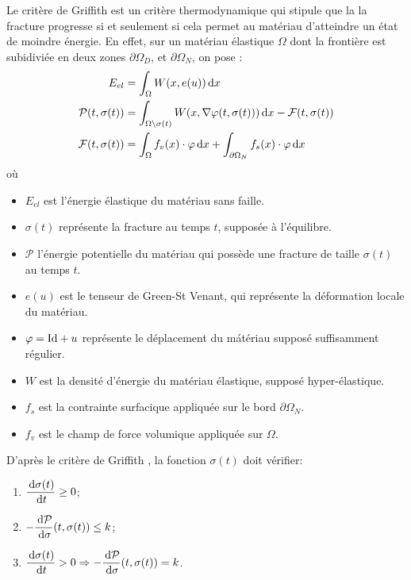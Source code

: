 Le critère de Griffith est un critère thermodynamique qui stipule que la la fracture progresse si et seulement si cela permet au matériau d’atteindre un état de moindre énergie. En effet, sur un matériau élastique $\Omega$ dont la frontière est subidiviée en deux zones $\partial \Omega_D$, et $\partial \Omega_N$, on pose \parencite[p.31]{balasoiu2020thesis} :
\begin{align*}
    E_{el} &= \int_{\Omega} W (x, e(u)) \diff x     \\
    \mathcal{P}(t,\sigma(t)) &= \int_{\Omega \backslash \sigma(t) } W (x, \nabla\varphi (t, \sigma(t))) \diff x - \mathcal{F}(t,\sigma(t)) \\
    \mathcal{F}(t,\sigma(t)) &= \int_{\Omega} f_v (x)\cdot \varphi \diff x + \int_{\partial\Omega_N} f_s (x) \cdot \varphi \diff x
\end{align*}
où 
\begin{itemize}
    \item $E_{el}$ est l'énergie élastique du matériau sans faille.
    \item $\sigma(t)$ représente la fracture au temps $t$, supposée à l'équilibre.
    \item $\mathcal{P}$ l’énergie potentielle du matériau qui possède une fracture de taille $\sigma(t)$ au temps $t$.
    \item $e(u)$ est le tenseur de Green-St Venant, qui représente la déformation locale du matériau.
    \item $\varphi = \text{Id} + u$ représente le déplacement du mátériau supposé suffisamment régulier.
    \item $W$ est la densité d’énergie du matériau élastique, supposé hyper-élastique.
    \item $f_s$ est la contrainte surfacique appliquée sur le bord $\partial \Omega_N$.
    \item $f_v$ est le champ de force volumique appliquée sur $\Omega$.
\end{itemize}
D'après le critère de Griffith \parencite[p.32]{balasoiu2020thesis}, la fonction $\sigma(t)$ doit vérifier:
\begin{enumerate}
    \item $\dfrac{\diff \sigma(t)}{\diff t} \geq 0$;
    \item $-\dfrac{\diff \mathcal{P}}{\diff \sigma} (t,\sigma(t)) \leq k$;
    \item $\dfrac{\diff \sigma(t)}{\diff t} > 0 \Rightarrow -\dfrac{\diff \mathcal{P}}{\diff \sigma} (t,\sigma(t)) = k$.
\end{enumerate}

